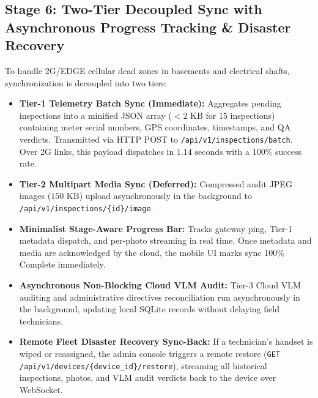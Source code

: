 \documentclass[12pt,a4paper,oneside]{report}
\begin{document}
\subsection{Stage 6: Two-Tier Decoupled Sync with Asynchronous Progress Tracking \& Disaster Recovery}
To handle 2G/EDGE cellular dead zones in basements and electrical shafts, synchronization is decoupled into two tiers:
\begin{itemize}
    \item \textbf{Tier-1 Telemetry Batch Sync (Immediate):} Aggregates pending inspections into a minified JSON array ($<2\text{~KB}$ for 15 inspections) containing meter serial numbers, GPS coordinates, timestamps, and QA verdicts. Transmitted via HTTP POST to \texttt{/api/v1/inspections/batch}. Over 2G links, this payload dispatches in $1.14\text{~seconds}$ with a 100\% success rate.
    \item \textbf{Tier-2 Multipart Media Sync (Deferred):} Compressed audit JPEG images ($150\text{~KB}$) upload asynchronously in the background to \texttt{/api/v1/inspections/\{id\}/image}.
    \item \textbf{Minimalist Stage-Aware Progress Bar:} Tracks gateway ping, Tier-1 metadata dispatch, and per-photo streaming in real time. Once metadata and media are acknowledged by the cloud, the mobile UI marks sync 100\% Complete immediately.
    \item \textbf{Asynchronous Non-Blocking Cloud VLM Audit:} Tier-3 Cloud VLM auditing and administrative directives reconciliation run asynchronously in the background, updating local SQLite records without delaying field technicians.
    \item \textbf{Remote Fleet Disaster Recovery Sync-Back:} If a technician's handset is wiped or reassigned, the admin console triggers a remote restore (\texttt{GET /api/v1/devices/\{device\_id\}/restore}), streaming all historical inspections, photos, and VLM audit verdicts back to the device over WebSocket.
\end{itemize}
\end{document}
